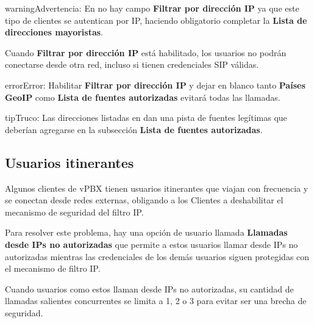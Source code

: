 \documentclass[letterpaper,10pt,spanish]{sphinxmanual}
\begin{document}
\begin{notice}{warning}{Advertencia:}
En {\hyperref[administration_portal/client/wholesale/index:wholesale\string-clients]{}} no hay campo \textbf{Filtrar por dirección IP} ya que este tipo de clientes se autentican por IP, haciendo obligatorio completar la \textbf{Lista de direcciones mayoristas}.
\end{notice}

Cuando \textbf{Filtrar por dirección IP} está habilitado, los usuarios no podrán conectarse desde otra red, incluso si tienen credenciales SIP válidas.

\begin{notice}{error}{Error:}
Habilitar \textbf{Filtrar por dirección IP} y dejar en blanco tanto \textbf{Países GeoIP} como \textbf{Lista de fuentes autorizadas} evitará todas las llamadas.
\end{notice}

\begin{notice}{tip}{Truco:}
Las direcciones listadas en {\hyperref[administration_portal/brand/views/ipfilter_blocked_addresses:ip\string-filter\string-blocked\string-addresses]{}} dan una pista de fuentes legítimas que deberían agregarse en la subsección \textbf{Lista de fuentes autorizadas}.
\end{notice}


\subsection{Usuarios itinerantes}
\label{security_and_maintenance/security/authorized_ip_ranges:id2}\label{security_and_maintenance/security/authorized_ip_ranges:roadwarrior-users}
Algunos clientes de vPBX tienen usuarios itinerantes que viajan con frecuencia y se conectan desde redes externas, obligando a los Clientes a deshabilitar el mecanismo de seguridad del filtro IP.

Para resolver este problema, hay una opción de usuario llamada \textbf{Llamadas desde IPs no autorizadas} que permite a estos usuarios llamar desde IPs no autorizadas mientras las credenciales de los demás usuarios siguen protegidas con el mecanismo de filtro IP.

Cuando usuarios como estos llaman desde IPs no autorizadas, su cantidad de llamadas salientes concurrentes se limita a 1, 2 o 3 para evitar ser una brecha de seguridad.
\end{document}
